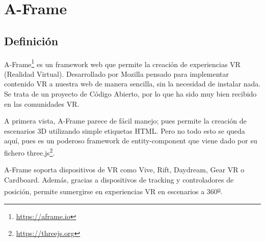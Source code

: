 \documentclass[a4paper, 12pt]{book}
\begin{document}

\section{A-Frame}
\label{sec:aframe}
\subsection{Definición}
A-Frame\footnote{\url{https://aframe.io}} es un framework web que permite la creación de experiencias VR (Realidad Virtual). Desarrollado por Mozilla pensado para implementar contenido VR a nuestra web de manera sencilla, sin la necesidad de instalar nada. Se trata de un proyecto de Código Abierto, por lo que ha sido muy bien recibido en las comunidades VR.

A primera vista, A-Frame parece de fácil manejo; pues permite la creación de escenarios 3D utilizando simple etiquetas HTML. Pero no todo esto se queda aquí, pues es un poderoso framework de entity-component que viene dado por su fichero three.js\footnote{\url{https://threejs.org}}.

A-Frame soporta dispositivos de VR como Vive, Rift, Daydream, Gear VR o Cardboard.
Además, gracias a dispositivos de tracking y controladores de posición, permite sumergirse en experiencias VR en escenarios a 360\textsuperscript{\underline{o}}.
\end{document}
